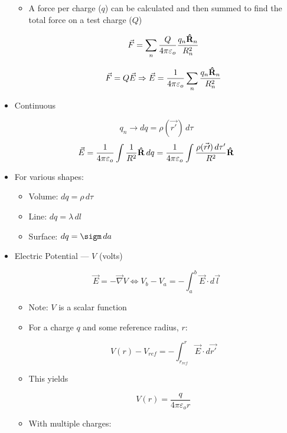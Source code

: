 \begin{itemize}
\begin{itemize}
      \item A force per charge  ($q$) can be calculated and then summed to find the total force on a test charge ($Q$)

        $$\vec{F}=\sum_n\frac{Q}{4\pi\varepsilon_o}\frac{q_n\bold{\hat{R}}_n}{R_n^2}$$

        $$\vec{F}=Q\vec{E}\Rightarrow \vec{E}=\frac{1}{4\pi\varepsilon_o}\sum_n\frac{q_n\bold{\hat{R}}_n}{R_n^2}$$

    \end{itemize}

  \item Continuous

    $$q_n\rightarrow dq=\rho(\vec{r\prime})\,d\tau$$
    $$\vec{E}=\frac{1}{4\pi\varepsilon_o}\int\frac{1}{R^2}\bold{\hat{R}}\,dq=\frac{1}{4\pi\varepsilon_o}\int \frac{\rho(\vec{r\prime})\,d\tau'}{R^2}\bold{\hat{R}}$$

  \item For various shapes:

    \begin{itemize}

      \item Volume: $dq=\rho\,d\tau$

      \item Line: $dq=\lambda\,dl$

      \item Surface: $dq=\sigm\,da$

    \end{itemize}

  \item Electric Potential — $V$ (volts)

      $$\vec{E}=-\vec{\nabla}V \Longleftrightarrow V_b-V_a=-\int_a^b \vec{E}\cdot d\vec{l}$$

    \begin{itemize}

      \item Note: $V$ is a scalar function

      \item For a charge $q$ and some reference radius, $r$:

        $$V(r)-V_{ref}=-\int_{r_{ref}}^r \vec{E}\cdot d\vec{r\prime}$$

      \item This yields

        $$V(r)=\frac{q}{4\pi\varepsilon_o r}$$

      \item With multiple charges:


\end{itemize}
\end{itemize}
